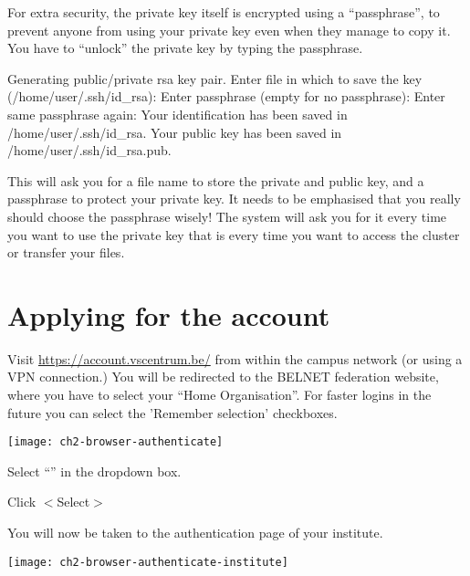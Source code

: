   For extra security, the private key itself is encrypted using a ``passphrase'',
  to prevent anyone from using your private key even when they manage to copy
  it. You have to ``unlock'' the private key by typing the passphrase.

\begin{prompt}
Generating public/private rsa key pair.
Enter file in which to save the key (/home/user/.ssh/id_rsa):
Enter passphrase (empty for no passphrase):
Enter same passphrase again:
Your identification has been saved in /home/user/.ssh/id_rsa.
Your public key has been saved in /home/user/.ssh/id_rsa.pub.
\end{prompt}

  This will ask you for a file name to store the private and public key, and a
  passphrase to protect your private key. It needs to be emphasised that you
  really should choose the passphrase wisely! The system will ask you for it
  every time you want to use the private key that is every time you want to
  access the cluster or transfer your files.

\fi %

\section{Applying for the account}
\label{sec:applying-for-the-account}

Visit \url{https://account.vscentrum.be/} from within the \university campus
network (or using a VPN connection.)
You will be redirected to the BELNET federation website,
where you have to select your ``Home Organisation''.
For faster logins in the future you can select the 'Remember selection' checkboxes.

\begin{center}
\texttt{[image: ch2-browser-authenticate]}
\end{center}

Select ``\university'' in the dropdown box.

Click $<$Select$>$

You will now be taken to the authentication page of your institute.

\ifantwerpen
\begin{center}
\texttt{[image: ch2-browser-authenticate-institute]}
\end{center}

